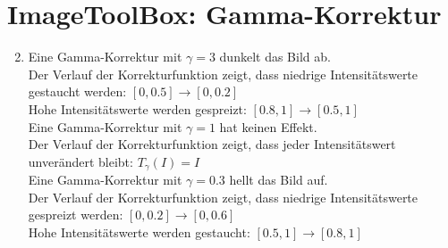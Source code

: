 \section{ImageToolBox: Gamma-Korrektur}
\begin{enumerate}
	\setcounter{enumi}{1}
	\item Eine Gamma-Korrektur mit $\gamma=3$ dunkelt das Bild ab. \\
	      Der Verlauf der Korrekturfunktion zeigt, dass niedrige Intensitätswerte gestaucht werden: $[0,0.5] \rightarrow [0,0.2]$\\
	      Hohe Intensitätswerte werden gespreizt: $[0.8,1] \rightarrow [0.5,1]$ \\

	      Eine Gamma-Korrektur mit $\gamma=1$ hat keinen Effekt. \\
	      Der Verlauf der Korrekturfunktion zeigt, dass jeder Intensitätswert unverändert bleibt: $T_\gamma(I)=I$ \\

	      Eine Gamma-Korrektur mit $\gamma=0.3$ hellt das Bild auf. \\
	      Der Verlauf der Korrekturfunktion zeigt, dass niedrige Intensitätswerte gespreizt werden: $[0,0.2] \rightarrow [0,0.6]$\\
	      Hohe Intensitätswerte werden gestaucht: $[0.5,1] \rightarrow [0.8,1]$
\end{enumerate}

